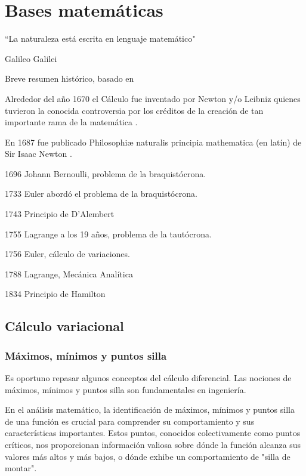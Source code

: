 \setchapterpreamble[u]{\margintoc}

\chapter{Bases matemáticas} \label{chap:mate}

\begin{kaobox}
	``La naturaleza está escrita en lenguaje matemático"
	\begin{flushright}
		Galileo Galilei
	\end{flushright}
\end{kaobox}

Breve resumen histórico, basado en \cite{GoodVibrations01}

Alrededor del año 1670 el Cálculo fue inventado por Newton y/o Leibniz quienes tuvieron
la conocida controversia por los créditos de la creación de tan importante rama de la
matemática \cite{guicciardini2003reading}.

En 1687 fue publicado Philosophiæ naturalis principia mathematica (en latín) de Sir Isaac Newton \cite{newton1987}.

1696 Johann Bernoulli, problema de la braquistócrona.

1733 Euler abordó el problema de la braquistócrona.

1743 Principio de D'Alembert

1755 Lagrange a los 19 años, problema de la tautócrona.

1756 Euler, cálculo de variaciones.

1788 Lagrange, Mecánica Analítica

1834 Principio de Hamilton

\section{Cálculo variacional}

\subsection{Máximos, mínimos y puntos silla}

Es oportuno repasar algunos conceptos del cálculo diferencial. Las nociones de máximos,
mínimos y puntos silla son fundamentales en ingeniería.

En el análisis matemático, la identificación de máximos, mínimos y puntos silla de una función es crucial para comprender su comportamiento y sus características importantes. Estos puntos, conocidos colectivamente como puntos críticos, nos proporcionan información valiosa sobre dónde la función alcanza sus valores más altos y más bajos, o dónde exhibe un comportamiento de "silla de montar".

